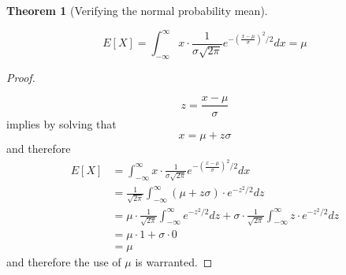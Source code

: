 \documentclass[10pt,]{book}
\theoremstyle{plain}
\newtheorem{theorem}{Theorem}[section]
\theoremstyle{definition}
\theoremstyle{definition}
\theoremstyle{definition}
\numberwithin{equation}{section}
\begin{document}
	
	
	
	
	
	\begin{theorem}[{Verifying the normal probability mean}]\label{theorem-56}

		\begin{equation*}E[X] = \int_{-\infty}^{\infty} x \cdot \frac{1}{\sigma \sqrt{2 \pi}} e^{ - \left ( \frac{x-\mu}{\sigma} \right ) ^2 / 2} dx = \mu\end{equation*}
\end{theorem}
\begin{proof}\hypertarget{proof-55}{}

	\begin{equation*}z = \frac{x-\mu}{\sigma}\end{equation*}
	implies by solving that
	\begin{equation*} x = \mu + z \sigma\end{equation*}
	and therefore
\begin{align*}
E[X] &= \int_{-\infty}^{\infty} x \cdot \frac{1}{\sigma \sqrt{2 \pi}} e^{ - \left ( \frac{x-\mu}{\sigma} \right ) ^2 / 2} dx \\
 &= \frac{1}{\sqrt{2 \pi}} \int_{-\infty}^{\infty} (\mu + z\sigma) \cdot e^{ -z^2 / 2} dz\\
 &= \mu \cdot \frac{1}{\sqrt{2 \pi}} \int_{-\infty}^{\infty} e^{ -z^2 / 2} dz + \sigma \cdot \frac{1}{\sqrt{2 \pi}} \int_{-\infty}^{\infty} z \cdot e^{ -z^2 / 2} dz\\
 &= \mu \cdot 1 + \sigma \cdot 0\\
 & = \mu
\end{align*}
	and therefore the use of \(\mu\) is warranted.
\end{proof}

	
	
	
	
\end{document}

